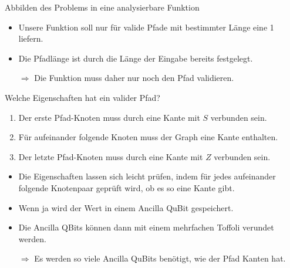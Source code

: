 \documentclass[fleqn,compress,utf8,aspectratio=169,t]{beamer}
\begin{document}
\begin{frame}{Abbilden des Problems in eine analysierbare Funktion}
\begin{itemize}
	\item Unsere Funktion soll nur für valide Pfade mit bestimmter Länge eine 1 liefern.
	\item Die Pfadlänge ist durch die Länge der Eingabe bereits festgelegt.
	\item[$\Rightarrow$] Die Funktion muss daher nur noch den Pfad validieren.
\end{itemize}
\end{frame}

\begin{frame}{Welche Eigenschaften hat ein valider Pfad?}
\begin{enumerate}
	\item Der erste Pfad-Knoten muss durch eine Kante mit $S$ verbunden sein.
	\item Für aufeinander folgende Knoten muss der Graph eine Kante enthalten.
	\item Der letzte Pfad-Knoten muss durch eine Kante mit $Z$ verbunden sein.
\end{enumerate}
\begin{itemize}
	\item Die Eigenschaften lassen sich leicht prüfen, indem für jedes aufeinander folgende Knotenpaar geprüft wird, ob es so eine Kante gibt.
	\item Wenn ja wird der Wert in einem Ancilla QuBit gespeichert.
	\item Die Ancilla QBits können dann mit einem mehrfachen Toffoli verundet werden.
	\item[$\Rightarrow$] Es werden so viele Ancilla QuBits benötigt, wie der Pfad Kanten hat.
\end{itemize}

\end{frame}
\end{document}
